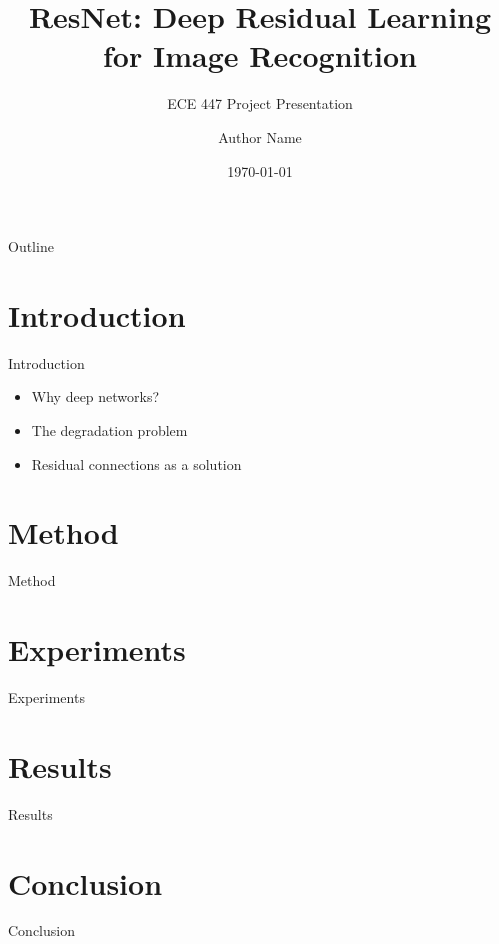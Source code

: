 \documentclass{beamer}
\title{ResNet: Deep Residual Learning for Image Recognition}
\subtitle{ECE 447 Project Presentation}
\author{Author Name}
\institute{ECE 447 -- Spring 2026}
\date{\today}
\begin{document}
\begin{frame}
  \titlepage
\end{frame}

\begin{frame}{Outline}
  \tableofcontents
\end{frame}

\section{Introduction}
\begin{frame}{Introduction}
  \begin{itemize}
    \item Why deep networks?
    \item The degradation problem
    \item Residual connections as a solution
  \end{itemize}
\end{frame}

\section{Method}
\begin{frame}{Method}
\end{frame}

\section{Experiments}
\begin{frame}{Experiments}
\end{frame}

\section{Results}
\begin{frame}{Results}
\end{frame}

\section{Conclusion}
\begin{frame}{Conclusion}
\end{frame}
\end{document}

